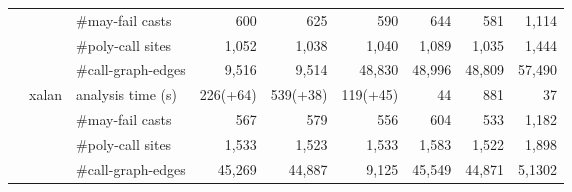 \begin{table}[]
\begin{tabular}{@{}c|clrrrrrr@{}}
&                            & \#may-fail casts     & 600                          & 625                        & 590                        & 644                      & 581                      & 1,114                       \\
&                            & \#poly-call sites    & 1,052                         & 1,038                       & 1,040                       & 1,089                     & 1,035                     & 1,444                       \\%
&                            & \#call-graph-edges   & 9,516                         & 9,514                       & 48,830                      & 48,996                    & 48,809                    & 57,490                      \\\cmidrule(){2-9}
&\multirow{4}{*}{xalan}      & analysis time (s)    & 226(+64)                     & 539(+38)                   & 119(+45)                   & 44                       & 881                      & 37                         \\
&                            & \#may-fail casts     & 567                          & 579                        & 556                        & 604                      & 533                      & 1,182                       \\
&                            & \#poly-call sites    & 1,533                         & 1,523                       & 1,533                       & 1,583                     & 1,522                     & 1,898                       \\%
&                            & \#call-graph-edges   & 45,269                        & 44,887                      & 9,125                       & 45,549                    & 44,871                    & 5,1302                      \\ \bottomrule 
\end{tabular}
\end{table}